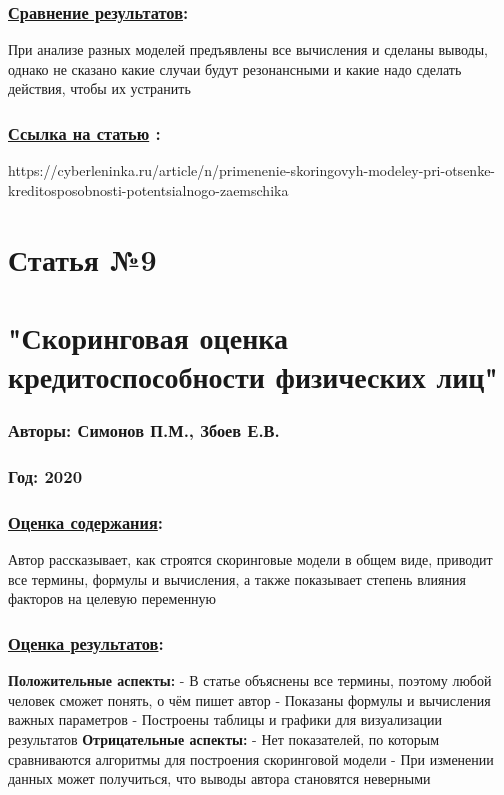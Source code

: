 \documentclass[a4paper,14pt]{article}
\begin{document}
\subsubsection*{\underline{Сравнение результатов}:}
При анализе разных моделей предъявлены все вычисления и сделаны выводы, однако не сказано какие случаи будут резонансными и какие надо сделать действия, чтобы их устранить
\subsubsection*{\underline{Ссылка на статью} :}
https://cyberleninka.ru/article/n/primenenie-skoringovyh-modeley-pri-otsenke-kreditosposobnosti-potentsialnogo-zaemschika



\newpage


\section*{Статья №9}
\section*{"Скоринговая оценка кредитоспособности физических лиц"}
\subsubsection*{Авторы: Симонов П.М., Збоев Е.В.}
\subsubsection*{Год: 2020}
\subsubsection*{\underline{Оценка содержания}:}
Автор рассказывает, как строятся скоринговые модели в общем виде, приводит все термины, формулы и вычисления, а также показывает степень влияния факторов на целевую переменную
\subsubsection*{\underline{Оценка результатов}:}
\textbf{Положительные аспекты:} \newline
- В статье объяснены все термины, поэтому любой человек сможет понять, о чём пишет автор \newline
- Показаны формулы и вычисления важных параметров \newline
- Построены таблицы и графики для визуализации результатов \newline
\textbf{Отрицательные аспекты:} \newline
- Нет показателей, по которым сравниваются алгоритмы для построения скоринговой модели \newline
- При изменении данных может получиться, что выводы автора становятся неверными
\end{document}
